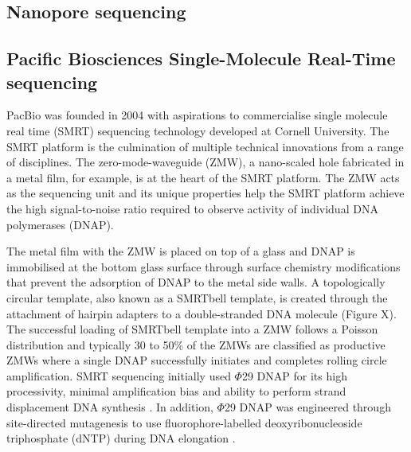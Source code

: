 \subsection{Nanopore sequencing}
%

\subsection{Pacific Biosciences Single-Molecule Real-Time sequencing}

PacBio was founded in 2004 with aspirations to commercialise single molecule real time (SMRT) sequencing technology developed at Cornell University. The SMRT platform is the culmination of multiple technical innovations from a range of disciplines. The zero-mode-waveguide (ZMW), a nano-scaled hole fabricated in a metal film, for example, is at the heart of the SMRT platform. The ZMW acts as the sequencing unit and its unique properties help the SMRT platform achieve the high signal-to-noise ratio required to observe activity of individual DNA polymerases (DNAP)\cite{Levene2003-og}. 

The metal film with the ZMW is placed on top of a glass and DNAP is immobilised at the bottom glass surface through surface chemistry modifications that prevent the adsorption of DNAP to the metal side walls\cite{Korlach2008-aq, Eid2009-ol}. A topologically circular template, also known as a SMRTbell template, is created through the attachment of hairpin adapters to a double-stranded DNA molecule (Figure X). The successful loading of SMRTbell template into a ZMW follows a Poisson distribution and typically 30 to 50\% of the ZMWs are classified as productive ZMWs where a single DNAP successfully initiates and completes rolling circle amplification. SMRT sequencing initially used $\Phi$29 DNAP for its high processivity, minimal amplification bias and ability to perform strand displacement DNA synthesis \cite{Eid2009-ol}. In addition, $\Phi$29 DNAP was engineered through site-directed mutagenesis to use fluorophore-labelled deoxyribonucleoside triphosphate (dNTP) during DNA elongation \cite{Korlach2008-fv,Eid2009-ol}. 

